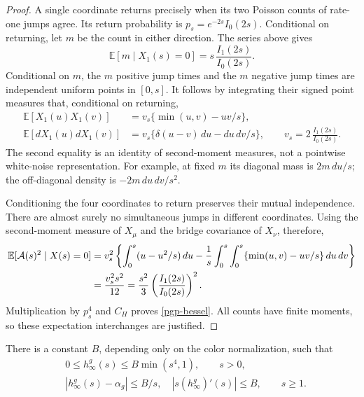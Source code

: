 \begin{proof}
A single coordinate returns precisely when its two
Poisson counts of rate-one jumps agree. Its return
probability is \(p_s=e^{-2s}I_0(2s)\). Conditional
on returning, let \(m\) be the count in either
direction. The series above gives
\[
 \mathbb E[m\mid X_1(s)=0]
          =s\,\frac{I_1(2s)}{I_0(2s)}.
\]
Conditional on \(m\), the \(m\) positive jump times
and the \(m\) negative jump times are independent
uniform points in \([0,s]\). It follows by integrating
their signed point measures that, conditional on
returning,
\begin{align*}
 \mathbb E[X_1(u)X_1(v)]
   &=v_s\{\min(u,v)-uv/s\},\\
 \mathbb E[dX_1(u)dX_1(v)]
   &=v_s\{\delta(u-v)\,du-d u\,d v/s\},\qquad
 v_s=2\,\frac{I_1(2s)}{I_0(2s)}.
\end{align*}
The second equality is an identity of second-moment
measures, not a pointwise white-noise representation.
For example, at fixed \(m\) its diagonal mass is
\(2m\,du/s\); the off-diagonal density is
\(-2m\,du\,dv/s^2\).

Conditioning the four coordinates to return preserves
their mutual independence. There are almost surely
no simultaneous jumps in different coordinates.
Using the second-moment measure of \(X_\mu\) and
the bridge covariance of \(X_\nu\), therefore,
\begin{align*}
 \mathbb E[{\cal A}(s)^2\mid X(s)=0]
 &=v_s^2\left\{
      \int_0^s(u-u^2/s)\,du
       -\frac1s\int_0^s\int_0^s
                         \{\min(u,v)-uv/s\}\,du\,dv\right\}\\
 &=\frac{v_s^2s^2}{12}
   =\frac{s^2}{3}\left(\frac{I_1(2s)}{I_0(2s)}\right)^2.
\end{align*}
Multiplication by \(p_s^4\) and \(C_H\) proves
\eqref{pgp-bessel}. All counts have finite moments,
so these expectation interchanges are justified.
\end{proof}

\begin{lemma}
\label{pgp-asymptotics}
There is a constant \(B\), depending only on the color
normalization, such that
\begin{align}
 &0\le h_\infty^g(s)\le B\min(s^4,1),\qquad s>0,
                                      \label{pgp-uniform-bound}\\
 &|h_\infty^g(s)-\alpha_g|\le B/s,\quad
   |s(h_\infty^g)'(s)|\le B,\qquad s\ge1.
                                      \label{pgp-asymptotic-bound}
\end{align}
\end{lemma}

